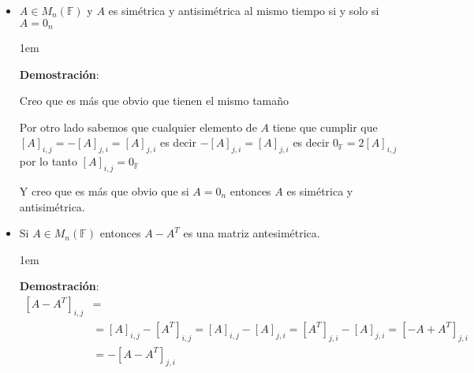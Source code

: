 \documentclass[12pt]{report}                                    %
\newenvironment{SmallIndentation}[1][0.75em]                    %
    {\begin{adjustwidth}{#1}{}\begin{footnotesize}}                 %
    {\end{footnotesize}\end{adjustwidth}}                           %
\begin{document}
\begin{itemize}
\begin{SmallIndentation}[1em]
                            \end{SmallIndentation}

                        \item $A \in M_{n}(\mathbb{F})$ y $A$ es simétrica y antisimétrica al mismo tiempo
                            si y solo si $A = 0_n$

                            \begin{SmallIndentation}[1em]
                                \textbf{Demostración}:

                                Creo que es más que obvio que tienen el mismo tamaño

                                Por otro lado sabemos que cualquier elemento de $A$ tiene que cumplir
                                que $[A]_{i,j}=-[A]_{j,i} = [A]_{j,i}$ es decir $-[A]_{j,i} = [A]_{j,i}$
                                es decir $0_{\mathbb{F}}=2[A]_{i,j}$ por lo tanto $[A]_{i,j}=0_\mathbb{F}$

                                Y creo que es más que obvio que si $A=0_n$ entonces $A$ es simétrica y
                                antisimétrica.

                            \end{SmallIndentation}


                        \item Si $A \in M_{n}(\mathbb{F})$ entonces $A-A^T$ es una matriz antesimétrica. 

                            \begin{SmallIndentation}[1em]
                                \textbf{Demostración}:
                                \begin{equation*}
                                \begin{split}
                                    [A-A^T]_{i,j}   &=                              \\
                                                    &=  [A]_{i,j} - [A^T]_{i,j}    
                                                     =  [A]_{i,j} - [A]_{j,i}    
                                                     =  [A^T]_{j,i} - [A]_{j,i}    
                                                     =  [-A+A^T]_{j, i}             \\
                                                    &= -[A-A^T]_{j, i}
                                \end{split}
                                \end{equation*}

                            \end{SmallIndentation}

                    \end{itemize}
\end{document}
